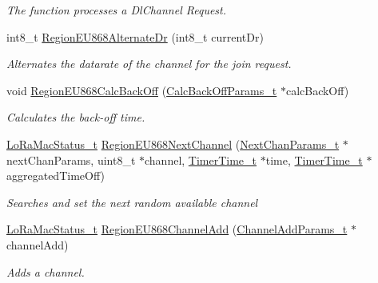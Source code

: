 \begin{DoxyCompactItemize}
\begin{DoxyCompactList}\small\item\em The function processes a Dl\+Channel Request. \end{DoxyCompactList}\item 
int8\+\_\+t \mbox{\hyperlink{group___r_e_g_i_o_n_e_u868_ga22c0717fe00e6234c2ed8b464b9efa5d}{Region\+E\+U868\+Alternate\+Dr}} (int8\+\_\+t current\+Dr)
\begin{DoxyCompactList}\small\item\em Alternates the datarate of the channel for the join request. \end{DoxyCompactList}\item 
void \mbox{\hyperlink{group___r_e_g_i_o_n_e_u868_ga0900ea63994bf51a3ee43bd4917e5647}{Region\+E\+U868\+Calc\+Back\+Off}} (\mbox{\hyperlink{group___r_e_g_i_o_n_ga7c5c9a8da174e6679eded8257dc92fd9}{Calc\+Back\+Off\+Params\+\_\+t}} $\ast$calc\+Back\+Off)
\begin{DoxyCompactList}\small\item\em Calculates the back-\/off time. \end{DoxyCompactList}\item 
\mbox{\hyperlink{group___l_o_r_a_m_a_c_ga30bd25657e10480f8605ee951b0ecfbd}{Lo\+Ra\+Mac\+Status\+\_\+t}} \mbox{\hyperlink{group___r_e_g_i_o_n_e_u868_ga8412e6babb47365a80386f4b937260eb}{Region\+E\+U868\+Next\+Channel}} (\mbox{\hyperlink{group___r_e_g_i_o_n_ga115f5e83afae352c0a3dcdc193374040}{Next\+Chan\+Params\+\_\+t}} $\ast$next\+Chan\+Params, uint8\+\_\+t $\ast$channel, \mbox{\hyperlink{utilities_8h_a4215ca43d3e953099ea758ce428599d0}{Timer\+Time\+\_\+t}} $\ast$time, \mbox{\hyperlink{utilities_8h_a4215ca43d3e953099ea758ce428599d0}{Timer\+Time\+\_\+t}} $\ast$aggregated\+Time\+Off)
\begin{DoxyCompactList}\small\item\em Searches and set the next random available channel \end{DoxyCompactList}\item 
\mbox{\hyperlink{group___l_o_r_a_m_a_c_ga30bd25657e10480f8605ee951b0ecfbd}{Lo\+Ra\+Mac\+Status\+\_\+t}} \mbox{\hyperlink{group___r_e_g_i_o_n_e_u868_gaa51182eab8774612408fd0ea8f89f63b}{Region\+E\+U868\+Channel\+Add}} (\mbox{\hyperlink{group___r_e_g_i_o_n_gab1c5f3aa06614283202906cef4417860}{Channel\+Add\+Params\+\_\+t}} $\ast$channel\+Add)
\begin{DoxyCompactList}\small\item\em Adds a channel. \end{DoxyCompactList}\item 

\end{DoxyCompactItemize}
